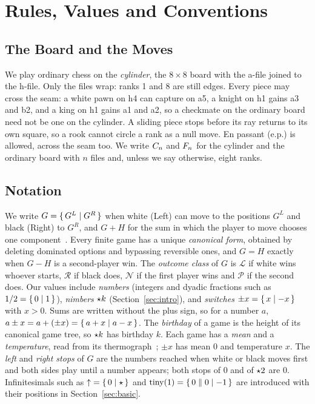 \section{Rules, Values and Conventions}\label{sec:rules}

\subsection{The Board and the Moves}
We play ordinary chess on the \emph{cylinder}, the $8\times8$ board with the a-file joined to the h-file. Only
the files wrap: ranks 1 and 8 are still edges. Every piece may cross the seam: a white pawn on h4 can capture on
a5, a knight on h1 gains a3 and b2, and a king on h1 gains a1 and a2, so a checkmate on the ordinary board need
not be one on the cylinder. A sliding piece stops before its ray returns to its own square, so a rook cannot
circle a rank as a null move. En passant (e.p.) is allowed, across the seam too. We write $C_{n}$ and
$F_{n}$ for the cylinder and the ordinary board with $n$ files and, unless we say otherwise, eight ranks.

\subsection{Notation}\label{sec:notation}
We write $G=\{\,G^L \mid G^R\,\}$ when white (Left) can move to the positions $G^L$ and black (Right) to $G^R$, and
$G+H$ for the sum in which the player to move chooses one component~\cite{WinningWays,ONAG,Siegel2013}. Every
finite game has a unique \emph{canonical form}, obtained by deleting dominated options and bypassing reversible
ones, and $G=H$ exactly when $G-H$ is a second-player win. The \emph{outcome class} of $G$ is $\mathcal{L}$ if
white wins whoever starts, $\mathcal{R}$ if black does, $\mathcal{N}$ if the first player wins and
$\mathcal{P}$ if the second does. Our values include \emph{numbers} (integers and dyadic fractions such as
$1/2=\{\,0 \mid 1\,\}$), \emph{nimbers} $\mathord{\star k}$ (Section~\ref{sec:intro}), and \emph{switches} $\pm x=\{\,x \mid -x\,\}$ with $x>0$. Sums are written without the plus sign,
so for a number $a$, $a\pm x=a+(\pm x)=\{\,a+x \mid a-x\,\}$. The \emph{birthday} of a game is the height of its
canonical game tree, so $\mathord{\star k}$ has birthday $k$. Each game has a \emph{mean} and a \emph{temperature}, read
from its thermograph~\cite{WinningWays}; $\pm x$ has mean $0$ and temperature $x$. The \emph{left} and
\emph{right stops} of $G$ are the numbers reached when white or black moves first and both sides play until a
number appears; both stops of $0$ and of $\mathord{\star2}$ are $0$. Infinitesimals such as ${\uparrow}=\{\,0 \mid \star\,\}$ and
$\operatorname{tiny}(1)=\{\,0 \parallel 0\mid -1\,\}$ are introduced with their positions in Section~\ref{sec:basic}.


